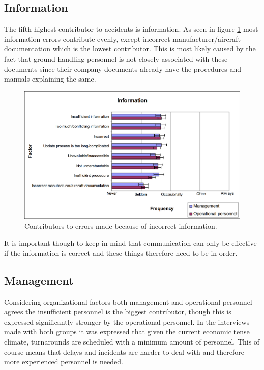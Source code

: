 \subsection{Information} %
The fifth highest contributor to accidents is information. As seen in figure \ref{Information} most information errors contribute evenly, except  incorrect manufacturer/aircraft documentation which is the lowest contributor. This is most likely caused by the fact that ground handling personnel is not closely associated with these documents since their company documents already have the procedures and manuals explaining the same.

\begin{figure}[H]
\centering
\includegraphics[width=\textwidth]{Grafik/Information}
\caption{Contributors to errors made because of incorrect information.}
\label{Information}
\end{figure}

It is important though to keep in mind that communication can only be effective if the information is correct and these things therefore need to be in order.

\newpage
\subsection{Management} %
Considering organizational factors both management and operational personnel agrees the insufficient personnel is the biggest contributor, though this is expressed significantly stronger by the operational personnel. In the interviews made with both groups it was expressed that given the current economic tense climate, turnarounds are scheduled with a minimum amount of personnel. This of course means that delays and incidents are harder to deal with and therefore more experienced personnel is needed.

